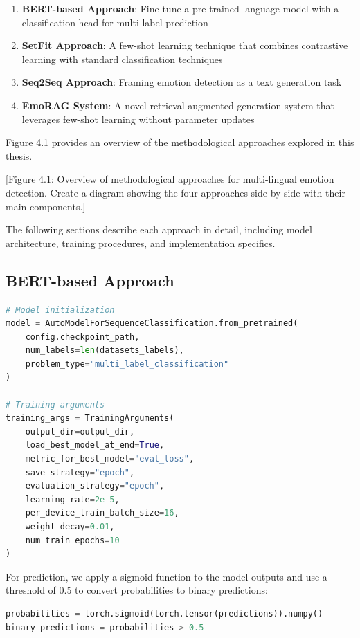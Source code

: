\documentclass[a4paper,12pt]{extarticle}
\begin{document}
\begin{enumerate}
\item \textbf{BERT-based Approach}: Fine-tune a pre-trained language model with a classification head for multi-label prediction
\item \textbf{SetFit Approach}: A few-shot learning technique that combines contrastive learning with standard classification techniques
\item \textbf{Seq2Seq Approach}: Framing emotion detection as a text generation task
\item \textbf{EmoRAG System}: A novel retrieval-augmented generation system that leverages few-shot learning without parameter updates
\end{enumerate}

Figure 4.1 provides an overview of the methodological approaches explored in this thesis.

[Figure 4.1: Overview of methodological approaches for multi-lingual emotion detection. Create a diagram showing the four approaches side by side with their main components.]

The following sections describe each approach in detail, including model architecture, training procedures, and implementation specifics.

\subsection{BERT-based Approach}

\begin{lstlisting}[language=Python]
# Model initialization
model = AutoModelForSequenceClassification.from_pretrained(
    config.checkpoint_path, 
    num_labels=len(datasets_labels),
    problem_type="multi_label_classification"
)

# Training arguments
training_args = TrainingArguments(
    output_dir=output_dir,
    load_best_model_at_end=True,
    metric_for_best_model="eval_loss",
    save_strategy="epoch",
    evaluation_strategy="epoch",
    learning_rate=2e-5,
    per_device_train_batch_size=16,
    weight_decay=0.01,
    num_train_epochs=10
)
\end{lstlisting}

For prediction, we apply a sigmoid function to the model outputs and use a threshold of 0.5 to convert probabilities to binary predictions:

\begin{lstlisting}[language=Python]
probabilities = torch.sigmoid(torch.tensor(predictions)).numpy()
binary_predictions = probabilities > 0.5
\end{lstlisting}
\end{document}
